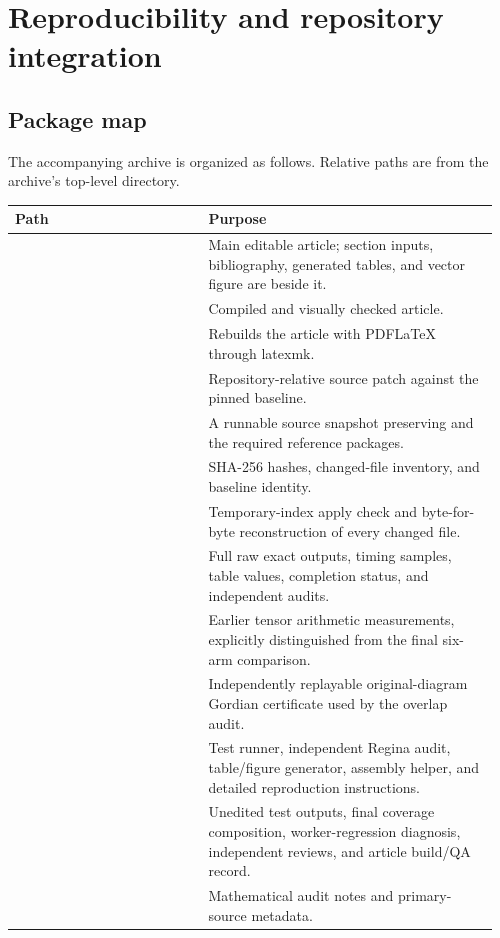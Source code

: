 \section{Reproducibility and repository integration}
\label{app:reproduce}

\subsection{Package map}

The accompanying archive is organized as follows. Relative paths are from
the archive's top-level directory.
\begin{longtable}{@{}P{0.38\linewidth}P{0.58\linewidth}@{}}
\toprule
Path & Purpose\\
\midrule
\endhead
{} & Main editable article;
section inputs, bibliography, generated tables, and vector figure are beside it.\\[4pt]
 & Compiled and visually checked
article.\\[4pt]
 & Rebuilds the article with PDFLaTeX through latexmk.\\[4pt]
 & Repository-relative source patch against
the pinned baseline.\\[4pt]
 & A runnable source snapshot preserving
 and the required reference packages.\\[4pt]
 & SHA-256 hashes, changed-file inventory,
and baseline identity.\\[4pt]
 & Temporary-index apply check and
byte-for-byte reconstruction of every changed file.\\[4pt]
 & Full raw exact outputs, timing samples, table values,
completion status, and independent audits.\\[4pt]
 & Earlier tensor arithmetic measurements,
explicitly distinguished from the final six-arm comparison.\\[4pt]
 & Independently replayable original-diagram Gordian
certificate used by the overlap audit.\\[4pt]
 & Test runner, independent Regina audit, table/figure
generator, assembly helper, and detailed reproduction instructions.\\[4pt]
 & Unedited test outputs, final coverage composition,
worker-regression diagnosis, independent reviews, and article build/QA record.\\[4pt]
 & Mathematical audit notes and primary-source metadata.\\
\bottomrule
\end{longtable}

